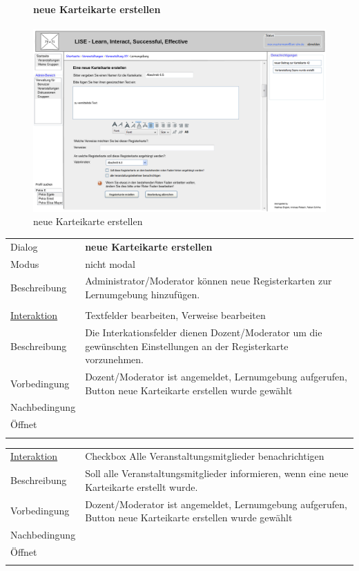 \documentclass[12pt,a4paper]{article}
\begin{document}
{\begin{figure}[H]
	\paragraph{neue Karteikarte erstellen}
	\includegraphics[width=\textwidth]{Bilder/Mockups/GUI/neueKarteikarte[ModeratorAdmin].png}
	\caption{neue Karteikarte erstellen}
	\label{GuineueKarteikarteerstellen}
\end{figure}

\begin{tabular}{l p{12cm}}
Dialog 	 		 & \textbf{neue Karteikarte erstellen} \\ 
Modus 			 & nicht modal\\ 
Beschreibung   	 & Administrator/Moderator können neue Registerkarten zur Lernumgebung hinzufügen.\\\\

\underline{Interaktion} & Textfelder bearbeiten, Verweise bearbeiten \\ 
Beschreibung   	 		& Die Interkationsfelder dienen Dozent/Moderator um die gewünschten Einstellungen an der Registerkarte vorzunehmen. \\
Vorbedingung	 		& Dozent/Moderator ist angemeldet, Lernumgebung aufgerufen, Button neue Karteikarte erstellen wurde gewählt \\
Nachbedingung	 		& \\
Öffnet			 		&  \\\\
\end{tabular}

\begin{tabular}{l p{12cm}}
\underline{Interaktion} &  Checkbox Alle Veranstaltungsmitglieder benachrichtigen\\ 
Beschreibung   	 		& Soll alle Veranstaltungsmitglieder informieren, wenn eine neue Karteikarte erstellt wurde.\\
Vorbedingung	 		& Dozent/Moderator ist angemeldet, Lernumgebung aufgerufen, Button neue Karteikarte erstellen wurde gewählt\\
Nachbedingung	 		& \\
Öffnet			 		&  \\\\
\end{tabular}

}
\end{document}
